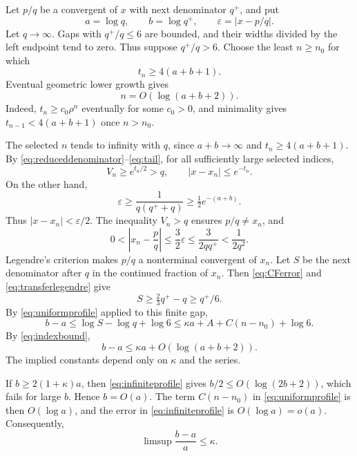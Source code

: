 \documentclass{amsart}
\numberwithin{equation}{section}
\begin{document}
Let $p/q$ be a convergent of $x$ with next denominator $q^+$, and put
\[
a=\log q,\qquad b=\log q^+,\qquad \varepsilon=|x-p/q|.
\]
Let $q\to\infty$. Gaps with $q^+/q\le6$ are bounded, and their widths
divided by the left endpoint tend to zero. Thus suppose $q^+/q>6$.
Choose the least $n\ge n_0$ for which
\begin{equation}\label{eq:chosentruncation}
t_n\ge4(a+b+1).
\end{equation}
Eventual geometric lower growth gives
\begin{equation}\label{eq:indexbound}
n=O(\log(a+b+2)).
\end{equation}
Indeed, $t_n\ge c_0\rho^n$ eventually for some $c_0>0$, and minimality gives
$t_{n-1}<4(a+b+1)$ once $n>n_0$.

The selected $n$ tends to infinity with $q$, since $a+b\to\infty$
and $t_n\ge4(a+b+1)$.
By \eqref{eq:reduceddenominator}--\eqref{eq:tail}, for all
sufficiently large selected indices,
\begin{equation}\label{eq:transfererror}
V_n\ge e^{t_n/2}>q,\qquad |x-x_n|\le e^{-t_n}.
\end{equation}
On the other hand,
\[
\varepsilon\ge\frac1{q(q^++q)}\ge\tfrac12e^{-(a+b)}.
\]
Thus $|x-x_n|<\varepsilon/2$. The inequality $V_n>q$ ensures
$p/q\ne x_n$, and
\begin{equation}\label{eq:transferlegendre}
0<\left|x_n-\frac pq\right|
\le\frac32\varepsilon\le\frac3{2qq^+}<\frac1{2q^2}.
\end{equation}
Legendre's criterion makes $p/q$ a nonterminal convergent of $x_n$.
Let $S$ be the next denominator after $q$ in the continued fraction of
$x_n$. Then
\eqref{eq:CFerror} and \eqref{eq:transferlegendre} give
\[
S\ge\tfrac23q^+-q\ge q^+/6.
\]
By \eqref{eq:uniformprofile} applied to this finite gap,
\[
b-a\le\log S-\log q+\log6
\le\kappa a+A+C(n-n_0)+\log6.
\]
By \eqref{eq:indexbound},
\begin{equation}\label{eq:infiniteprofile}
b-a\le\kappa a+O(\log(a+b+2)).
\end{equation}
The implied constants depend only on $\kappa$ and the series.

If $b\ge2(1+\kappa)a$, then \eqref{eq:infiniteprofile} gives
$b/2\le O(\log(2b+2))$, which fails for large $b$. Hence $b=O(a)$.
The term $C(n-n_0)$ in \eqref{eq:uniformprofile} is then $O(\log a)$,
and the error in \eqref{eq:infiniteprofile} is $O(\log a)=o(a)$.
Consequently,
\begin{equation}\label{eq:limitinggap}
\limsup\frac{b-a}{a}\le\kappa.
\end{equation}
\end{document}
